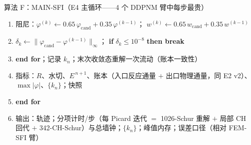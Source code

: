 \documentclass[11pt]{article}
\newcommand{\kwd}[1]{\textbf{#1}}
\newcommand{\ind}{\hspace*{1.5em}}
\newcommand{\indd}{\hspace*{3.0em}}
\newenvironment{pseudo}[1]{\begin{algobox}{#1}%
  \begin{enumerate}[label={\ttfamily\arabic*}, leftmargin=3.4em, itemsep=1.5pt, topsep=1pt, parsep=0pt]}%
  {\end{enumerate}\end{algobox}}
\begin{document}
\begin{pseudo}{算法 F：MAIN-SFI（E4 主循环——4 个 DDPNM 臂中每步最贵）}
\item \indd 阻尼：$\varphi^{(k)}\leftarrow0.65\,\varphi_{\mathrm{cand}}+0.35\,\varphi^{(k-1)}$；
$w^{(k)}\leftarrow0.65\,w_{\mathrm{cand}}+0.35\,w^{(k-1)}$
\item \indd $\delta_k\leftarrow\|\varphi_{\mathrm{cand}}-\varphi^{(k-1)}\|_\infty$；
\kwd{if} $\delta_k\le10^{-8}$ \kwd{then break}
\item \ind \kwd{end for}；记录 $k_n$；末次收敛态重解一次流动（账本一致性）
\item \ind 指标：$R$、水切、$E^{\,n+1}$、账本（入口反应通量 $+$ 出口物理通量，同 E2 v2）、
$\max|\varphi|$、$\{k_n\}$；快照
\item \kwd{end for}
\item 输出：轨迹；分项计时/步（每 Picard 迭代 $=$ 1026-Schur 重解 $+$ 局部 CH 回代 $+$
342-CH-Schur）与总墙钟；$\{k_n\}$；峰值内存；误差口径（相对 FEM-SFI 臂）
\end{pseudo}
\end{document}
